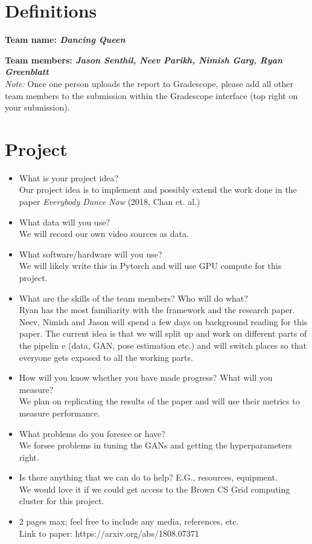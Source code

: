 \section*{Definitions}

\textbf{Team name: \emph{Dancing Queen}}

\textbf{Team members: \emph{Jason Senthil, Neev Parikh, Nimish Garg, Ryan Greenblatt}}\\
\emph{Note:} Once one person uploads the report to Gradescope, please add all other team members to the submission within the Gradescope interface (top right on your submission).


\section*{Project}
\begin{itemize}
  \item What is your project idea? \\
      Our project idea is to implement and possibly extend the work done in the paper \textit{Everybody Dance Now} (2018, Chan et. al.) 
  \item What data will you use? \\
      We will record our own video sources as data.
  \item What software/hardware will you use? \\
      We will likely write this in Pytorch and will use GPU compute for this project. 
  \item What are the skills of the team members? Who will do what? \\
      Ryan has the most familiarity with the framework and the research paper. Neev, Nimish and Jason will spend a few days on background reading for this paper. The current idea is that we will split up and work on different parts of the pipelin e (data, GAN, pose estimation etc.) and will switch places so that everyone gets exposed to all the working parts. 
  \item How will you know whether you have made progress? What will you measure? \\
      We plan on replicating the results of the paper and will use their metrics to measure performance. 
  \item What problems do you foresee or have? \\ 
      We forsee problems in tuning the GANs and getting the hyperparameters right. 
  \item Is there anything that we can do to help? E.G., resources, equipment. \\
      We would love it if we could get access to the Brown CS Grid computing cluster for this project. 
  \item 2 pages max; feel free to include any media, references, etc. \\
      Link to paper: https://arxiv.org/abs/1808.07371
\end{itemize}



